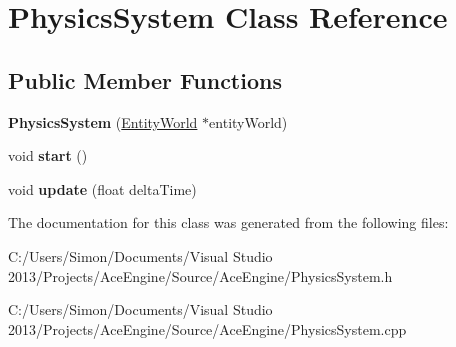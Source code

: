 \hypertarget{class_physics_system}{}\section{Physics\+System Class Reference}
\label{class_physics_system}
\subsection*{Public Member Functions}
\begin{DoxyCompactItemize}
\item 
\hypertarget{class_physics_system_af0e1507b77930b4a837ae64f654c502c}{}{\bfseries Physics\+System} (\hyperlink{class_entity_world}{Entity\+World} $\ast$entity\+World)\label{class_physics_system_af0e1507b77930b4a837ae64f654c502c}

\item 
\hypertarget{class_physics_system_a82f2b0b10a8b4c736fe4504678bbde23}{}void {\bfseries start} ()\label{class_physics_system_a82f2b0b10a8b4c736fe4504678bbde23}

\item 
\hypertarget{class_physics_system_a7e97af2ff3ac8bf879ab289397eb939c}{}void {\bfseries update} (float delta\+Time)\label{class_physics_system_a7e97af2ff3ac8bf879ab289397eb939c}

\end{DoxyCompactItemize}


The documentation for this class was generated from the following files\+:\begin{DoxyCompactItemize}
\item 
C\+:/\+Users/\+Simon/\+Documents/\+Visual Studio 2013/\+Projects/\+Ace\+Engine/\+Source/\+Ace\+Engine/Physics\+System.\+h\item 
C\+:/\+Users/\+Simon/\+Documents/\+Visual Studio 2013/\+Projects/\+Ace\+Engine/\+Source/\+Ace\+Engine/Physics\+System.\+cpp\end{DoxyCompactItemize}
